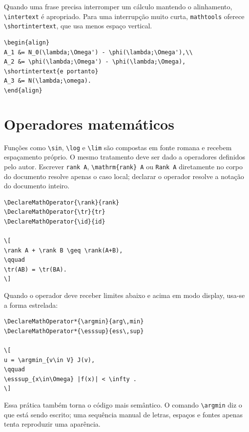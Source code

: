 Quando uma frase precisa interromper um cálculo mantendo o alinhamento, \verb|\intertext| é apropriado. Para uma interrupção muito curta, \texttt{mathtools} oferece \verb|\shortintertext|, que usa menos espaço vertical.

\begin{lstlisting}[language={[latex]TeX}, caption={Interrupção preservando alinhamento}]
\begin{align}
A_1 &= N_0(\lambda;\Omega') - \phi(\lambda;\Omega'),\\
A_2 &= \phi(\lambda;\Omega') - \phi(\lambda;\Omega),
\shortintertext{e portanto}
A_3 &= N(\lambda;\omega).
\end{align}
\end{lstlisting}

\section{Operadores matemáticos}

Funções como \verb|\sin|, \verb|\log| e \verb|\lim| são compostas em fonte romana e recebem espaçamento próprio. O mesmo tratamento deve ser dado a operadores definidos pelo autor. Escrever \verb|rank A|, \verb|\mathrm{rank} A| ou \verb|Rank A| diretamente no corpo do documento resolve apenas o caso local; declarar o operador resolve a notação do documento inteiro.

\begin{lstlisting}[language={[latex]TeX}, caption={Declaração de operadores}]
\DeclareMathOperator{\rank}{rank}
\DeclareMathOperator{\tr}{tr}
\DeclareMathOperator{\id}{id}

\[
\rank A + \rank B \geq \rank(A+B),
\qquad
\tr(AB) = \tr(BA).
\]
\end{lstlisting}

Quando o operador deve receber limites abaixo e acima em modo display, usa-se a forma estrelada:

\begin{lstlisting}[language={[latex]TeX}, caption={Operador com limites}]
\DeclareMathOperator*{\argmin}{arg\,min}
\DeclareMathOperator*{\esssup}{ess\,sup}

\[
u = \argmin_{v\in V} J(v),
\qquad
\esssup_{x\in\Omega} |f(x)| < \infty .
\]
\end{lstlisting}

Essa prática também torna o código mais semântico. O comando \verb|\argmin| diz o que está sendo escrito; uma sequência manual de letras, espaços e fontes apenas tenta reproduzir uma aparência.

